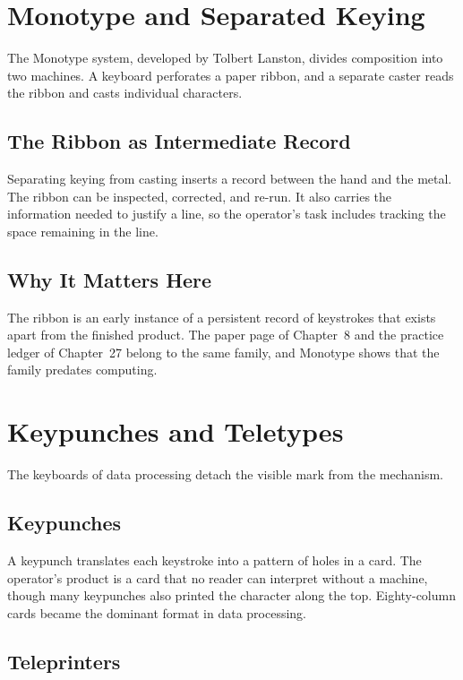 \chapter{Monotype and Separated Keying}

The Monotype system, developed by Tolbert Lanston, divides composition into two machines.  A keyboard perforates a paper ribbon, and a separate caster reads the ribbon and casts individual characters.

\section{The Ribbon as Intermediate Record}

Separating keying from casting inserts a record between the hand and the metal. The ribbon can be inspected, corrected, and re-run. It also carries the information needed to justify a line, so the operator's task includes tracking the space remaining in the line.

\section{Why It Matters Here}

The ribbon is an early instance of a persistent record of keystrokes that exists apart from the finished product. The paper page of Chapter~8 and the practice ledger of Chapter~27 belong to the same family, and Monotype shows that the family predates computing.

\chapter{Keypunches and Teletypes}

The keyboards of data processing detach the visible mark from the mechanism.

\section{Keypunches}

A keypunch translates each keystroke into a pattern of holes in a card. The operator's product is a card that no reader can interpret without a machine, though many keypunches also printed the character along the top. Eighty-column cards became the dominant format in data processing. 

\section{Teleprinters}

